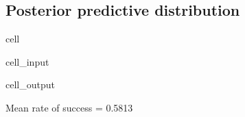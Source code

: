 \documentclass[letterpaper,10pt,english]{jupyterBook}
\begin{document}
\subsection{Posterior predictive distribution}
\label{\detokenize{Lecture 3:posterior-predictive-distribution}}
\begin{sphinxuseclass}{cell}\begin{sphinxVerbatimInput}

\begin{sphinxuseclass}{cell_input}
\begin{sphinxVerbatim}[commandchars=\\\{\}]
\end{sphinxVerbatim}

\end{sphinxuseclass}\end{sphinxVerbatimInput}
\begin{sphinxVerbatimOutput}

\begin{sphinxuseclass}{cell_output}
\begin{sphinxVerbatim}[commandchars=\\\{\}]
Mean rate of success = 0.5813
\end{sphinxVerbatim}

\end{sphinxuseclass}\end{sphinxVerbatimOutput}

\end{sphinxuseclass}
\end{document}
